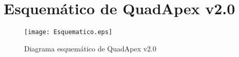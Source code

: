 \chapter{Esquemático de QuadApex v2.0}

\begin{figure}[hbtp]
	\caption{Diagrama esquemático de QuadApex v2.0}
	\centering
	\texttt{[image: Esquematico.eps]}
	\label{fig:esquematico_fpaa}
\end{figure}